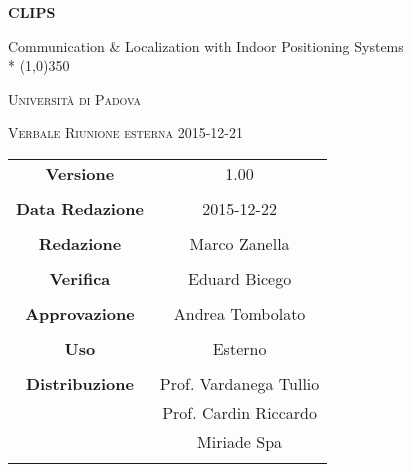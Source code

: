 \documentclass[a4paper,12pt]{article}
\author{Marco Zanella}
\date{22/12/2015}
\begin{document}
\begin{titlepage}
	\centering
	{\huge\bfseries CLIPS\par}
	Communication \& Localization with Indoor Positioning Systems \\*
	\line(1,0){350} \\
	{\scshape\LARGE Università di Padova \par}
	\vspace{1cm}
	{\scshape\Large Verbale Riunione esterna 2015-12-21 \par}
	\logo
	\newpage
	\begin{tabular}{c|c}
		{\hfill\textbf{Versione}} 			& 1.00				\\ \\
		{\hfill\textbf{Data Redazione}} 	& 2015-12-22	  		\\ \\
		{\hfill\textbf{Redazione}} 			& Marco Zanella		\\ \\
		{\hfill\textbf{Verifica}} 			& Eduard Bicego		\\ \\
		{\hfill\textbf{Approvazione}} 		& Andrea Tombolato	\\ \\
		{\hfill\textbf{Uso}} 				& Esterno	\\ \\
		{\hfill\textbf{Distribuzione}} 		& Prof. Vardanega Tullio \\
											& Prof. Cardin Riccardo \\
											& Miriade Spa \\ \\
	\end{tabular}
\end{titlepage}
	
	\newpage

	
	\label{LastFrontPage}
	

	\newpage
	
	\pagestyle{mymain}
	
	
		

	
		
	
	
		
	
	
		
				
	\label{LastPage}
\end{document}
